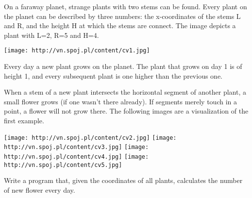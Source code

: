 On a faraway planet, strange plants with two stems can be found. Every plant on the planet can be described by three numbers: the x-coordinates of the stems L and R, and the height H at which the stems are connect. The image depicts a plant with L=2, R=5 and H=4.  


\texttt{[image: http://vn.spoj.pl/content/cv1.jpg]}

   Every day a new plant grows on the planet. The plant that grows on day 1 is of height 1, and every subsequent plant is one higher than the previous one.  

   When a stem of a new plant intersects the horizontal segment of another plant, a small flower grows (if one wasn't there already). If segments merely touch in a point, a flower will not grow there. The following images are a visualization of the first example.  


\texttt{[image: http://vn.spoj.pl/content/cv2.jpg]}
\texttt{[image: http://vn.spoj.pl/content/cv3.jpg]}
\texttt{[image: http://vn.spoj.pl/content/cv4.jpg]}
\texttt{[image: http://vn.spoj.pl/content/cv5.jpg]}

   Write a program that, given the coordinates of all plants, calculates the number of new flower every day.  

\